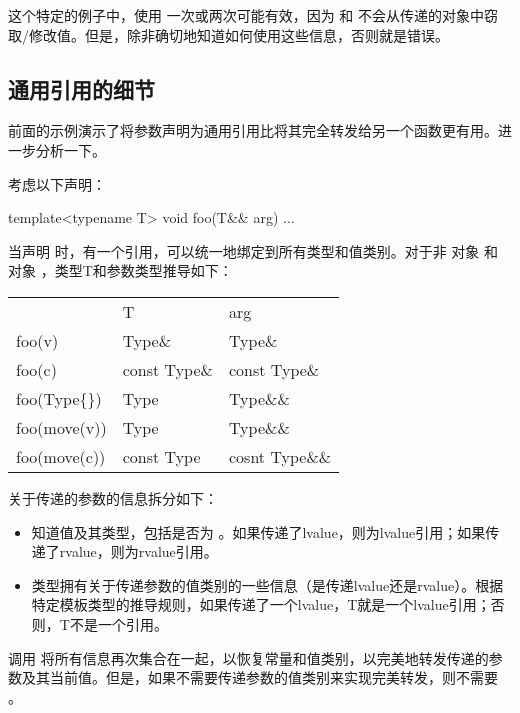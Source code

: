 这个特定的例子中，使用  一次或两次可能有效，因为  和  不会从传递的对象中窃取/修改值。但是，除非确切地知道如何使用这些信息，否则就是错误。

\subsection{通用引用的细节}

前面的示例演示了将参数声明为通用引用比将其完全转发给另一个函数更有用。进一步分析一下。

考虑以下声明：

\begin{cppcode}
template<typename T>
void foo(T&& arg) {
	...
}
\end{cppcode}

当声明  时，有一个引用，可以统一地绑定到所有类型和值类别。对于非  对象  和  对象 ，类型T和参数类型推导如下：

\begin{table}[H]
	\begin{tabular}{lll}
		& T            & arg            \\
		foo(v)        & Type\&       & Type\&         \\
		foo(c)        & const Type\& & const Type\&   \\
		foo(Type\{\}) & Type         & Type\&\&       \\
		foo(move(v))  & Type         & Type\&\&       \\
		foo(move(c))  & const Type   & cosnt Type\&\&
	\end{tabular}
\end{table}

关于传递的参数的信息拆分如下：

\begin{itemize}
	\item {} 知道值及其类型，包括是否为 。如果传递了lvalue，则为lvalue引用；如果传递了rvalue，则为rvalue引用。
	\item {} 类型拥有关于传递参数的值类别的一些信息（是传递lvalue还是rvalue）。根据特定模板类型的推导规则，如果传递了一个lvalue，T就是一个lvalue引用；否则，T不是一个引用。
\end{itemize}

调用  将所有信息再次集合在一起，以恢复常量和值类别，以完美地转发传递的参数及其当前值。但是，如果不需要传递参数的值类别来实现完美转发，则不需要 。

